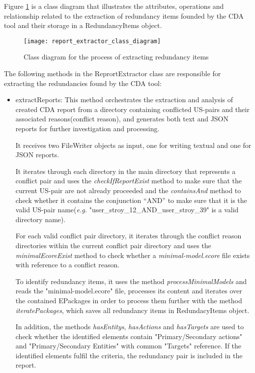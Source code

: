 Figure \ref{fig:report_extractor_class_diagram} is a class diagram that illustrates the attributes, operations and relationship related to the extraction of redundancy items founded by the CDA tool and their storage in a RedundancyItems object.
\begin{figure}[h]
	\centering
	\texttt{[image: report\_extractor\_class\_diagram]}
	\caption{Class diagram for the process of extracting redundancy items}\label{fig:report_extractor_class_diagram}
\end{figure} 

The following methods in the ReprortExtractor class are responsible for extracting the redundancies found by the CDA tool:
\begin{itemize}
	\item extractReports: This method orchestrates the extraction and analysis of created CDA report from a directory containing conflicted US-pairs and their associated reasons(conflict reason), and generates both text and JSON reports for further investigation and processing.
	
	It receives two FileWriter objects as input, one for writing textual and one for JSON reports.
	
	It iterates through each directory in the main directory that represents a conflict pair and uses the \textit{checkIfReportExist} method to make sure that the current US-pair are not already proceeded and the \textit{containsAnd} method to check whether it contains the conjunction \enquote{AND} to make sure that it is the valid US-pair name(\textit{e.g.} "user\_stroy\_12\_AND\_user\_stroy\_39" is a valid directory name).
	
	For each valid conflict pair directory, it iterates through the conflict reason directories within the current conflict pair directory and uses the \textit{minimalEcoreExist} method to check whether a \textit{minimal-model.ecore} file exists with reference to a conflict reason.
	
	To identify redundancy items, it uses the method \textit{processMinimalModels} and reads the "minimal-model.ecore" file, processes its content and iterates over the contained EPackages in order to process them further with the method \textit{iteratePackages}, which saves all redundancy items in RedundacyItems object.
	
	In addition, the methods \textit{hasEntitys}, \textit{hasActions} and \textit{hasTargets} are used to check whether the identified elements contain "Primary/Secondary actions" and "Primary/Secondary Entities" with common "Targets" reference. If the identified elements fulfil the criteria, the redundancy pair is included in the report.
	

\end{itemize}
